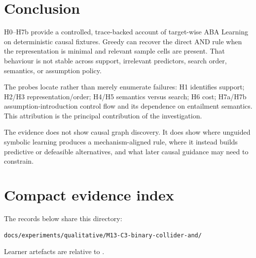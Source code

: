 \documentclass[11pt]{article}
\begin{document}
\section{Conclusion}

H0--H7b provide a controlled, trace-backed account of target-wise ABA Learning
on deterministic causal fixtures. Greedy can recover the direct AND rule when
the representation is minimal and relevant sample cells are present. That
behaviour is not stable across support, irrelevant predictors, search order,
semantics, or assumption policy.

The probes locate rather than merely enumerate failures: H1 identifies
support; H2/H3 representation/order; H4/H5 semantics versus search; H6 cost;
H7a/H7b assumption-introduction control flow and its dependence on entailment
semantics. This attribution is the principal contribution of the investigation.

The evidence does not show causal graph discovery. It does show where unguided
symbolic learning produces a mechanism-aligned rule, where it instead builds
predictive or defeasible alternatives, and what later causal guidance may
need to constrain.

\appendix

\section{Compact evidence index}

The records below share this directory:

\begin{lstlisting}
docs/experiments/qualitative/M13-C3-binary-collider-and/
\end{lstlisting}

Learner artefacts are relative to
.
\end{document}
